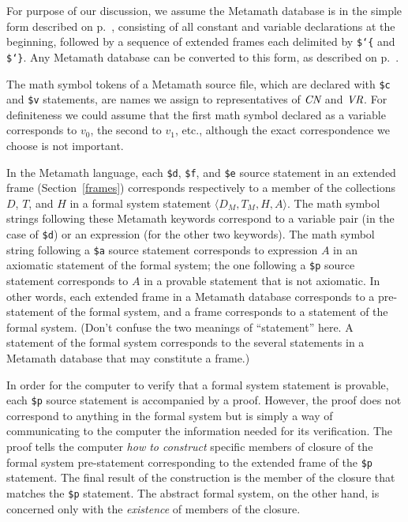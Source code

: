 For purpose of our discussion, we assume the Metamath database
is in the simple form described on p.~\pageref{framelist},
consisting of all constant and variable declarations at the beginning,
followed by a sequence of extended frames each
delimited by \texttt{\$\char`\{} and \texttt{\$\char`\}}.  Any Metamath database can
be converted to this form, as described on p.~\pageref{frameconvert}.

The math symbol tokens of a Metamath source file, which are declared
with \texttt{\$c} and \texttt{\$v} statements, are names we assign to
representatives of $\mbox{\em CN}$ and $\mbox{\em VR}$.  For
definiteness we could assume that the first math symbol declared as a
variable corresponds to $v_0$, the second to $v_1$, etc., although the
exact correspondence we choose is not important.

In the Metamath language, each \texttt{\$d}, \texttt{\$f}, and
 \texttt{\$e} source
statement in an extended frame (Section~\ref{frames})
corresponds respectively to a member of the
collections $D$, $T$, and $H$ in a formal system statement $\langle
D_M,T_M,H,A\rangle$.  The math symbol strings following these Metamath keywords
correspond to a variable pair (in the case of \texttt{\$d}) or an expression (for
the other two keywords). The math symbol string following a \texttt{\$a} source
statement corresponds to expression $A$ in an axiomatic statement of the
formal system; the one following a \texttt{\$p} source statement corresponds to
$A$ in a provable statement that is not axiomatic.  In other words, each
extended frame in a Metamath database corresponds to
a pre-statement of the formal system, and a frame corresponds to
a statement of the formal system.  (Don't confuse the two meanings of
``statement'' here.  A statement of the formal system corresponds to the
several statements in a Metamath database that may constitute a
frame.)

In order for the computer to verify that a formal system statement is
provable, each \texttt{\$p} source statement is accompanied by a proof.
However, the proof does not correspond to anything in the formal system
but is simply a way of communicating to the computer the information
needed for its verification.  The proof tells the computer {\em how to
construct} specific members of closure of the formal system
pre-statement corresponding to the extended frame of the \texttt{\$p}
statement.  The final result of the construction is the member of the
closure that matches the \texttt{\$p} statement.  The abstract formal
system, on the other hand, is concerned only with the {\em existence} of
members of the closure.

